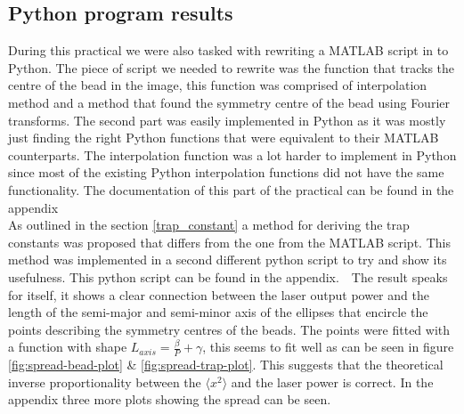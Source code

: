 \clearpage{}
\subsection{Python program results}
\label{results}
During this practical we were also tasked with rewriting a MATLAB script in to Python. The piece of script we needed to rewrite was the function that tracks the centre of the bead in the image, this function was comprised of interpolation method and a method that found the symmetry centre of the bead using Fourier transforms. The second part was easily implemented in Python as it was mostly just finding the right Python functions that were equivalent to their MATLAB counterparts. The interpolation function was a lot harder to implement in Python since most of the existing Python interpolation functions did not have the same functionality. The documentation of this part of the practical can be found in the appendix\\

As outlined in the section \ref{trap_constant} a method for deriving the trap constants was proposed that differs from the one from the MATLAB script. This method was implemented in a second different python script to try and show its usefulness. This python script can be found in the appendix.\
\
 The result speaks for itself, it shows a clear connection between the laser output power and the length of the semi-major and semi-minor axis of the ellipses that encircle the points describing the symmetry centres of the beads. The points were fitted with a function with shape $L_{axis}=\frac{\beta}{P}+\gamma$, this seems to fit well as can be seen in figure \ref{fig:spread-bead-plot} \& \ref{fig:spread-trap-plot}. This suggests that the theoretical inverse proportionality between the $\langle x^2 \rangle$ and the laser power is correct. In the appendix three more plots showing the spread can be seen.

